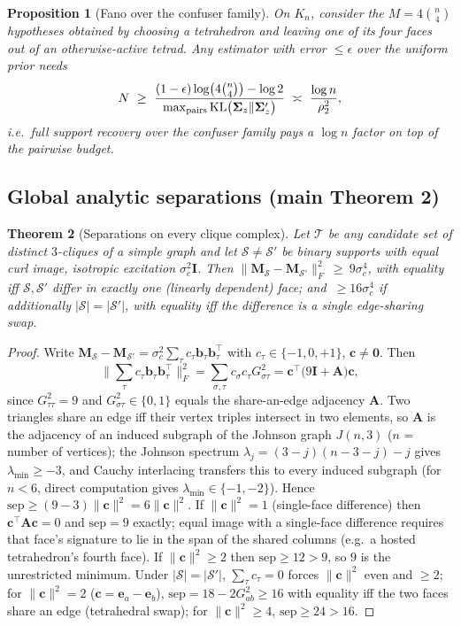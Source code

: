\documentclass[11pt]{article}
\newtheorem{theorem}{Theorem}[section]
\newtheorem{proposition}[theorem]{Proposition}
\newcommand{\Scal}{\mathcal{S}}
\newcommand{\Tcal}{\mathcal{T}}
\newcommand{\KL}{\mathrm{KL}}
\begin{document}
\begin{proposition}[Fano over the confuser family]
On $K_n$, consider the $M=4\binom n4$ hypotheses obtained by choosing a
tetrahedron and leaving one of its four faces out of an otherwise-active
tetrad. Any estimator with error $\le\epsilon$ over the uniform prior needs
\[
N\ \ge\ \frac{(1-\epsilon)\log\!\big(4\tbinom n4\big)-\log 2}
{\max_{\text{pairs}}\KL\big(\bm\Sigma_z\|\bm\Sigma_z'\big)}
\ \asymp\ \frac{\log n}{\rho_2^2},
\]
i.e.\ full support recovery over the confuser family pays a $\log n$ factor
on top of the pairwise budget.
\end{proposition}

\subsection{Global analytic separations (main Theorem 2)}

\begin{theorem}[Separations on every clique complex]\label{thm:sep-global}
Let $\Tcal$ be any candidate set of distinct $3$-cliques of a simple graph
and let $\Scal\ne\Scal'$ be binary supports with equal curl image, isotropic
excitation $\sigma_c^2\bm I$. Then
$\|\bm M_\Scal-\bm M_{\Scal'}\|_F^2\ \ge\ 9\sigma_c^4$, with equality iff
$\Scal,\Scal'$ differ in exactly one (linearly dependent) face; and
$\ \ge16\sigma_c^4$ if additionally $|\Scal|=|\Scal'|$, with equality iff the
difference is a single edge-sharing swap.
\end{theorem}
\begin{proof}
Write $\bm M_\Scal-\bm M_{\Scal'}
=\sigma_c^2\sum_\tau c_\tau\bm b_\tau\bm b_\tau^{\!\top}$ with
$c_\tau\in\{-1,0,+1\}$, $\bm c\ne\bm0$. Then
\[
\Big\|\sum_\tau c_\tau\bm b_\tau\bm b_\tau^{\!\top}\Big\|_F^2
=\sum_{\sigma,\tau}c_\sigma c_\tau G_{\sigma\tau}^2
=\bm c^{\!\top}\!\big(9\bm I+\bm A\big)\bm c ,
\]
since $G_{\tau\tau}^2=9$ and $G_{\sigma\tau}^2\in\{0,1\}$ equals the
share-an-edge adjacency $\bm A$. Two triangles share an edge iff their vertex
triples intersect in two elements, so $\bm A$ is the adjacency of an induced
subgraph of the Johnson graph $J(n,3)$ ($n$ = number of vertices); the
Johnson spectrum $\lambda_j=(3-j)(n-3-j)-j$ gives
$\lambda_{\min}\ge-3$, and Cauchy interlacing transfers this to every induced
subgraph (for $n<6$, direct computation gives $\lambda_{\min}\in\{-1,-2\}$).
Hence $\mathrm{sep}\ge(9-3)\|\bm c\|^2=6\|\bm c\|^2$. If $\|\bm c\|^2=1$
(single-face difference) then $\bm c^{\!\top}\bm A\bm c=0$ and
$\mathrm{sep}=9$ exactly; equal image with a single-face difference requires
that face's signature to lie in the span of the shared columns (e.g.\ a
hosted tetrahedron's fourth face). If $\|\bm c\|^2\ge2$ then
$\mathrm{sep}\ge12>9$, so $9$ is the unrestricted minimum. Under
$|\Scal|=|\Scal'|$, $\sum_\tau c_\tau=0$ forces $\|\bm c\|^2$ even and
$\ge2$; for $\|\bm c\|^2=2$ ($\bm c=\bm e_a-\bm e_b$),
$\mathrm{sep}=18-2G_{ab}^2\ge16$ with equality iff the two faces share an
edge (tetrahedral swap); for $\|\bm c\|^2\ge4$,
$\mathrm{sep}\ge24>16$.
\end{proof}
\end{document}
